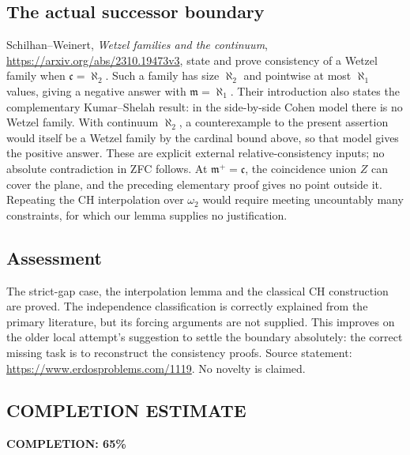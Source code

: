 \subsection*{The actual successor boundary}
Schilhan--Weinert, \emph{Wetzel families and the continuum}, \url{https://arxiv.org/abs/2310.19473v3}, state and prove consistency of a Wetzel family when $\mathfrak c=\aleph_2$. Such a family has size $\aleph_2$ and pointwise at most $\aleph_1$ values, giving a negative answer with $\mathfrak m=\aleph_1$.
Their introduction also states the complementary Kumar--Shelah result: in the side-by-side Cohen model there is no Wetzel family. With continuum $\aleph_2$, a counterexample to the present assertion would itself be a Wetzel family by the cardinal bound above, so that model gives the positive answer.
These are explicit external relative-consistency inputs; no absolute contradiction in ZFC follows. At $\mathfrak m^+=\mathfrak c$, the coincidence union $Z$ can cover the plane, and the preceding elementary proof gives no point outside it. Repeating the CH interpolation over $\omega_2$ would require meeting uncountably many constraints, for which our lemma supplies no justification.

\subsection*{Assessment}
The strict-gap case, the interpolation lemma and the classical CH construction are proved. The independence classification is correctly explained from the primary literature, but its forcing arguments are not supplied. This improves on the older local attempt's suggestion to settle the boundary absolutely: the correct missing task is to reconstruct the consistency proofs.
Source statement: \url{https://www.erdosproblems.com/1119}. No novelty is claimed.
\subsection*{COMPLETION ESTIMATE}
\textbf{COMPLETION: 65\%}
